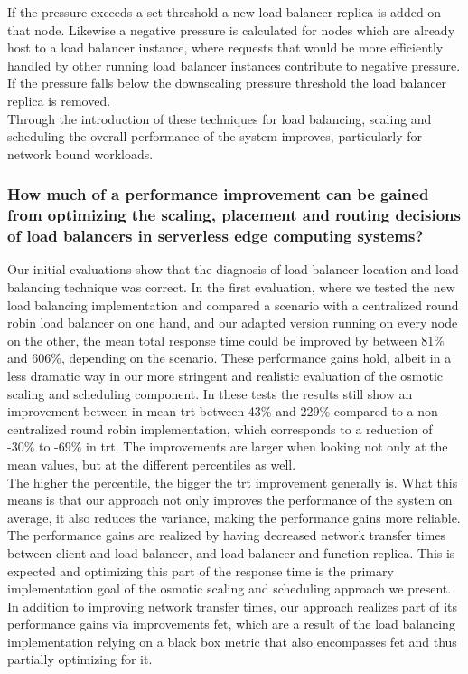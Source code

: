 If the pressure exceeds a set threshold a new load balancer replica is added on that node.
Likewise a negative pressure is calculated for nodes which are already host to a load balancer instance, where requests that would be more efficiently handled by other running load balancer instances contribute to negative pressure.
If the pressure falls below the downscaling pressure threshold the load balancer replica is removed.\\
Through the introduction of these techniques for load balancing, scaling and scheduling the overall performance of the system improves, particularly for network bound workloads.


\subsubsection{How much of a performance improvement can be gained from optimizing the scaling,
placement and routing decisions of load balancers in serverless edge computing
systems?}

Our initial evaluations show that the diagnosis of load balancer location and load balancing technique was correct.
In the first evaluation, where we tested the new load balancing implementation and compared a scenario with a centralized round robin load balancer on one hand, and our adapted version running on every node on the other, the mean total response time could be improved by between 81\% and 606\%, depending on the scenario.
These performance gains hold, albeit in a less dramatic way in our more stringent and realistic evaluation of the osmotic scaling and scheduling component.
In these tests the results still show an improvement between in mean \gls{trt} between 43\% and 229\% compared to a non-centralized round robin implementation, which corresponds to a reduction of -30\% to -69\% in \gls{trt}.
The improvements are larger when looking not only at the mean values, but at the different percentiles as well.\\
The higher the percentile, the bigger the \gls{trt} improvement generally is.
What this means is that our approach not only improves the performance of the system on average, it also reduces the variance, making the performance gains more reliable.
The performance gains are realized by having decreased network transfer times between client and load balancer, and load balancer and function replica.
This is expected and optimizing this part of the response time is the primary implementation goal of the osmotic scaling and scheduling approach we present.
In addition to improving network transfer times, our approach realizes part of its performance gains via improvements \gls{fet}, which are a result of the load balancing implementation relying on a black box metric that also encompasses \gls{fet} and thus partially optimizing for it.


